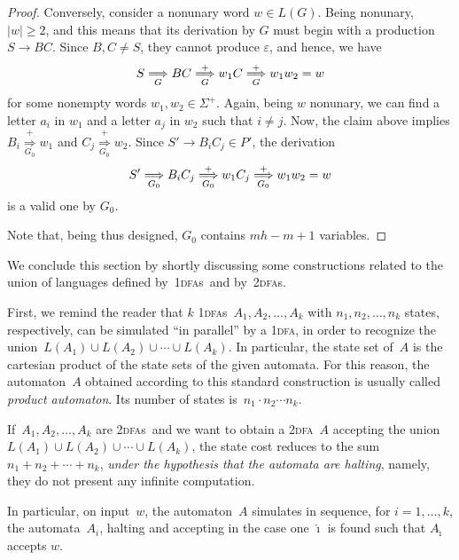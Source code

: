 \documentclass[11pt]{article}
\newcommand*{\tw}{\textsc{2}}
\newcommand*{\twdfa}{\tw\textsc{dfa}}
\newcommand*{\twdfas}{\tw\textsc{dfa}s}
\newcommand*{\ow}{\textsc{1}}
\newcommand*{\owdfa}{\ow\textsc{dfa}}
\newcommand*{\owdfas}{\ow\textsc{dfa}s}
\newcommand{\derivesForm}[2]{\mathrel{\underset{\scriptstyle #1}{\overset{\scriptstyle #2}{\Longrightarrow}}}}
\newcommand{\DerivesGrammar}[1]{\derivesForm{#1}{+}}
\newcommand{\DERIVESGrammar}[2]{\derivesForm{#1}{#2}}
\newcommand{\derGrammar}[1]{\DERIVESGrammar{#1}{}}
\newcommand{\DerivesG}{\DerivesGrammar{G}}
\newcommand{\derG}{\derGrammar{G}}
\newcommand{\DerivesZ}{\DerivesGrammar{G_0}}
\newcommand{\derZ}{\derGrammar{G_0}}
\begin{document}
\begin{proof}
Conversely, consider a nonunary word $w \in L(G)$. 
Being nonunary, $|w| \ge 2$, and this means that its derivation by $G$ must begin with a production $S \to BC$. 
Since $B, C \neq S$, they cannot produce $\varepsilon$, and hence, we have
\[S \derG BC \DerivesG w_1 C \DerivesG w_1 w_2 = w
\] 
for some nonempty words $w_1, w_2 \in \Sigma^+$. 
Again, being $w$ nonunary, we can find a letter $a_i$ in $w_1$ and a letter $a_j$ in $w_2$ such that $i \neq j$. 
Now, the claim above implies $B_i \DerivesZ w_1$ and $C_j \DerivesZ w_2$. 
Since $S' \to B_i C_j \in P'$, the derivation 
\[S' \derZ B_i C_j \DerivesZ w_1 C_j \DerivesZ w_1 w_2 = w
\]
is a valid one by $G_0$. 

Note that, being thus designed, $G_0$ contains $mh{-}m{+}1$ variables.
\end{proof}

We conclude this section by shortly discussing some constructions related to the union of
languages defined by~\owdfas\ and by~\twdfas.

First, we remind the reader that  $k$ \owdfas~$A_1,A_2,\ldots,A_k$ with $n_1,n_2,\ldots,n_k$ states,
respectively, can be simulated ``in parallel'' by a \owdfa, in
order to recognize the union~$L(A_1)\cup L(A_2)\cup\cdots\cup L(A_k)$. In particular, the state set
of~$A$ is the cartesian product of the state sets of the given automata. For this reason,
the automaton~$A$ obtained according to this standard construction is
usually called \emph{product automaton}. Its number of states is~$n_1\cdot n_2\cdots n_k$.

\smallskip

If~$A_1,A_2,\ldots,A_k$ are \twdfas\ and we want to obtain a \twdfa~$A$
accepting the union~$L(A_1)\cup L(A_2)\cup\cdots\cup L(A_k)$,
the state cost reduces to the sum $n_1 + n_2 + \cdots + n_k$,
\emph{under the hypothesis that the automata are halting}, namely, they do not present any infinite computation.

In particular, on input~$w$, the automaton~$A$ simulates in sequence, for $i=1,\ldots,k$, the automata~$A_i$, 
halting and accepting in the case one $\hat\imath$ is found
such that $A_{\hat\imath}$ accepts $w$. 
\end{document}
